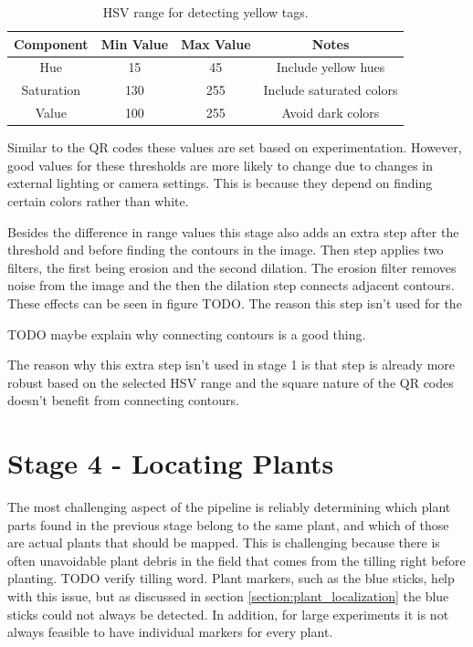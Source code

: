 \begin{table}[hb]
    \begin{center}
    \caption[Yellow Tags Detection Values]{HSV range for detecting yellow tags.}
    \begin{tabular}[c]{|c|c|c|c|}
        \hline
        Component & Min Value & Max Value & Notes \\
        \hline
        Hue        & 15  & 45  & Include yellow hues       \\
        Saturation & 130 & 255 & Include saturated colors  \\
        Value      & 100 & 255 & Avoid dark colors         \\
        \hline
    \end{tabular}
    \label{table:stick_hsv_ranges}
   \end{center}
\end{table}

Similar to the QR codes these values are set based on experimentation.   However, good values for these thresholds are more likely to change due to changes in external lighting or camera settings.  This is because they depend on finding certain colors rather than white.




Besides the difference in range values this stage also adds an extra step after the threshold and before finding the contours in the image.  Then step applies two filters, the first being erosion and the second dilation.  The erosion filter removes noise from the image and the then the dilation step connects adjacent contours.  These effects can be seen in figure TODO.  The reason this step isn't used for the 

TODO maybe explain why connecting contours is a good thing.

The reason why this extra step isn't used in stage 1 is that step is already more robust based on the selected HSV range and the square nature of the QR codes doesn't benefit from connecting contours.   

\section{Stage 4 - Locating Plants}
\label{processing-stage4}

The most challenging aspect of the pipeline is reliably determining which plant parts found in the previous stage belong to the same plant, and which of those are actual plants that should be mapped.  This is challenging because there is often unavoidable plant debris in the field that comes from the tilling right before planting. TODO verify tilling word.  Plant markers, such as the blue sticks, help with this issue, but as discussed in section \ref{section:plant_localization} the blue sticks could not always be detected.  In addition, for large experiments it is not always feasible to have individual markers for every plant.  

